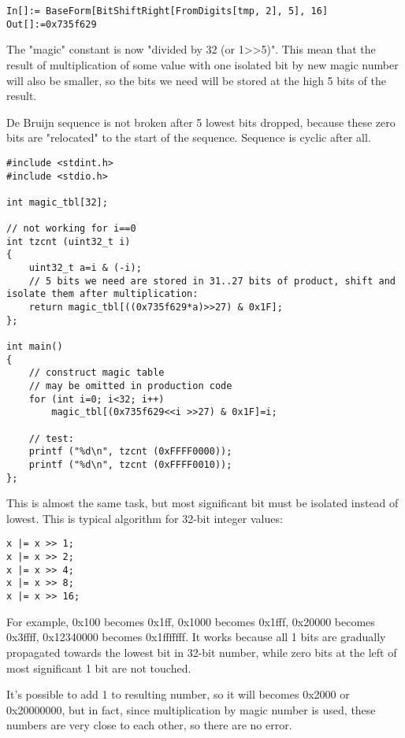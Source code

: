 \begin{lstlisting}
In[]:= BaseForm[BitShiftRight[FromDigits[tmp, 2], 5], 16]
Out[]:=0x735f629
\end{lstlisting}

The "magic" constant is now "divided by 32 (or 1>>5)".
This mean that the result of multiplication of some value with one isolated bit by new magic number will also be smaller, so the bits we need will
be stored at the high 5 bits of the result.

De Bruijn sequence is not broken after 5 lowest bits dropped, because these zero bits are "relocated" to the start of the sequence.
Sequence is cyclic after all.

\begin{lstlisting}[style=customc]
#include <stdint.h>
#include <stdio.h>

int magic_tbl[32];

// not working for i==0
int tzcnt (uint32_t i)
{
	uint32_t a=i & (-i);
	// 5 bits we need are stored in 31..27 bits of product, shift and isolate them after multiplication:
	return magic_tbl[((0x735f629*a)>>27) & 0x1F];
};

int main()
{
	// construct magic table
	// may be omitted in production code
	for (int i=0; i<32; i++)
		magic_tbl[(0x735f629<<i >>27) & 0x1F]=i;
	
	// test:
	printf ("%d\n", tzcnt (0xFFFF0000));
	printf ("%d\n", tzcnt (0xFFFF0010));
};
\end{lstlisting}


This is almost the same task, but most significant bit must be isolated instead of lowest.
This is typical algorithm for 32-bit integer values:

\begin{lstlisting}
x |= x >> 1;
x |= x >> 2;
x |= x >> 4;
x |= x >> 8;
x |= x >> 16;
\end{lstlisting}

For example, 0x100 becomes 0x1ff, 0x1000 becomes 0x1fff, 0x20000 becomes 0x3ffff, 0x12340000 becomes 0x1fffffff.
It works because all 1 bits are gradually propagated towards the lowest bit in 32-bit number,
while zero bits at the left of most significant 1 bit are not touched.

It's possible to add 1 to resulting number, so it will becomes 0x2000 or 0x20000000, but in fact, since multiplication by magic number is used,
these numbers are very close to each other, so there are no error.

